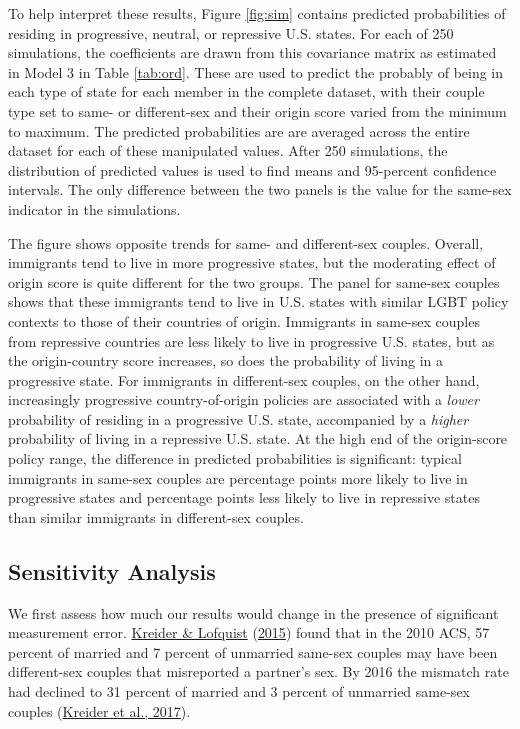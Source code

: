 \documentclass[
  11pt,
]{article}
\begin{document}
To help interpret these results, Figure \ref{fig:sim} contains predicted probabilities of residing in progressive, neutral, or repressive U.S. states. For each of 250 simulations, the coefficients are drawn from this covariance matrix as estimated in Model 3 in Table \ref{tab:ord}. These are used to predict the probably of being in each type of state for each member in the complete dataset, with their couple type set to same- or different-sex and their origin score varied from the minimum to maximum. The predicted probabilities are are averaged across the entire dataset for each of these manipulated values. After 250 simulations, the distribution of predicted values is used to find means and 95-percent confidence intervals. The only difference between the two panels is the value for the same-sex indicator in the simulations.

The figure shows opposite trends for same- and different-sex couples. Overall, immigrants tend to live in more progressive states, but the moderating effect of origin score is quite different for the two groups. The panel for same-sex couples shows that these immigrants tend to live in U.S. states with similar LGBT policy contexts to those of their countries of origin. Immigrants in same-sex couples from repressive countries are less likely to live in progressive U.S. states, but as the origin-country score increases, so does the probability of living in a progressive state. For immigrants in different-sex couples, on the other hand, increasingly progressive country-of-origin policies are associated with a \emph{lower} probability of residing in a progressive U.S. state, accompanied by a \emph{higher} probability of living in a repressive U.S. state. At the high end of the origin-score policy range, the difference in predicted probabilities is significant: typical immigrants in same-sex couples are percentage points more likely to live in progressive states and percentage points less likely to live in repressive states than similar immigrants in different-sex couples.

\hypertarget{sensitivity-analysis}{%
\subsection{Sensitivity Analysis}\label{sensitivity-analysis}}

We first assess how much our results would change in the presence of significant measurement error. \protect\hyperlink{ref-kreider_2015}{Kreider \& Lofquist} (\protect\hyperlink{ref-kreider_2015}{2015}) found that in the 2010 ACS, 57 percent of married and 7 percent of unmarried same-sex couples may have been different-sex couples that misreported a partner's sex. By 2016 the mismatch rate had declined to 31 percent of married and 3 percent of unmarried same-sex couples (\protect\hyperlink{ref-kreider_2017}{Kreider et al., 2017}).
\end{document}
